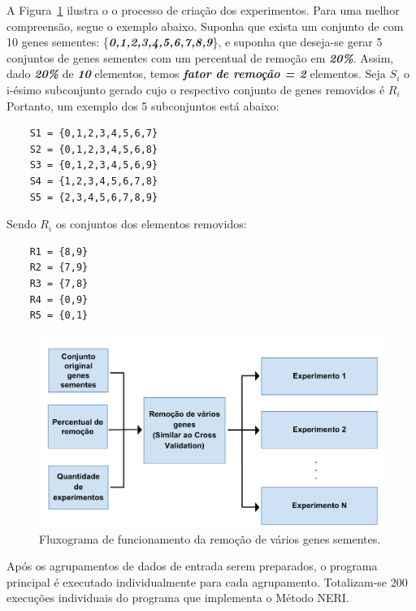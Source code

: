 A Figura~\ref{cvv_explanation} ilustra o o processo de criação dos experimentos.
%
Para uma melhor compreensão, segue o exemplo abaixo.
Suponha que exista um conjunto de com 10 genes sementes: \{\textsl{\textbf{0,1,2,3,4,5,6,7,8,9}}\}, e suponha que deseja-se gerar 5 conjuntos de genes sementes com um percentual de remoção em \textsl{\textbf{20\%}}.
%
Assim, dado \textsl{\textbf{20\%}} de \textsl{\textbf{10}} elementos, temos \textsl{\textbf{fator de remoção = 2}} elementos.
Seja $S_i$ o i-ésimo subconjunto gerado cujo o respectivo conjunto de genes removidos é $R_i$
Portanto, um exemplo dos 5 subconjuntos está abaixo:

\begin{lstlisting}
    S1 = {0,1,2,3,4,5,6,7}
    S2 = {0,1,2,3,4,5,6,8}
    S3 = {0,1,2,3,4,5,6,9}
    S4 = {1,2,3,4,5,6,7,8}
    S5 = {2,3,4,5,6,7,8,9}
\end{lstlisting}

Sendo $R_i$ os conjuntos dos elementos removidos:

\begin{lstlisting}
    R1 = {8,9}
    R2 = {7,9}
    R3 = {7,8}
    R4 = {0,9}
    R5 = {0,1} 
\end{lstlisting}

\begin{figure}[ht!]
\centering
\includegraphics[width=\textwidth]{Images/flows/cvv_explanation.png}
\caption {Fluxograma de funcionamento da remoção de vários genes sementes.
\label{cvv_explanation}}
\end{figure}
%


Após os agrupamentos de dados de entrada serem preparados, o programa principal é executado individualmente para cada agrupamento. Totalizam-se 200 execuções individuais do programa que implementa o Método NERI.

